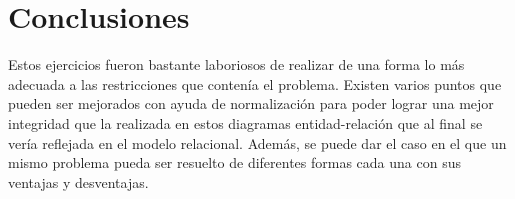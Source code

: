 \documentclass[12pt, titlepage]{article}
\begin{document}
	\section{Conclusiones}
	Estos ejercicios fueron bastante laboriosos de realizar de una forma lo más adecuada a las restricciones que contenía el problema. Existen varios puntos que pueden ser mejorados con ayuda de normalización para poder lograr una mejor integridad que la realizada en estos diagramas entidad-relación que al final se vería reflejada en el modelo relacional. Además, se puede dar el caso en el que un mismo problema pueda ser resuelto de diferentes formas cada una con sus ventajas y desventajas. 
	 
	
\end{document}
